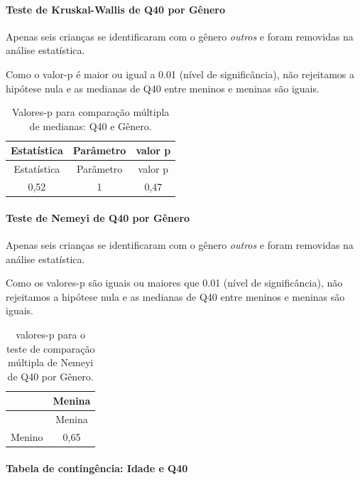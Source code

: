 \documentclass[]{article}
\let\oldparagraph\paragraph
\renewcommand{\paragraph}[1]{\oldparagraph{#1}\mbox{}}
\begin{document}
\hypertarget{teste-de-kruskal-wallis-de-q40-por-guxeanero}{%
\paragraph{Teste de Kruskal-Wallis de Q40 por Gênero}\label{teste-de-kruskal-wallis-de-q40-por-guxeanero}}

Apenas seis crianças se identificaram com o gênero \emph{outros} e foram removidas na análise estatística.

Como o valor-p é maior ou igual a 0.01 (nível de significância), não rejeitamos a hipótese nula e as medianas de Q40 entre meninos e meninas são iguais.

\begin{longtable}[]{@{}ccc@{}}
\caption{\label{tab:unnamed-chunk-1564}Valores-p para comparação múltipla de medianas: Q40 e Gênero.}\tabularnewline
\toprule
Estatística & Parâmetro & valor p\tabularnewline
\midrule
\endfirsthead
\toprule
Estatística & Parâmetro & valor p\tabularnewline
\midrule
\endhead
0,52 & 1 & 0,47\tabularnewline
\bottomrule
\end{longtable}

\hypertarget{teste-de-nemeyi-de-q40-por-guxeanero}{%
\paragraph{Teste de Nemeyi de Q40 por Gênero}\label{teste-de-nemeyi-de-q40-por-guxeanero}}

Apenas seis crianças se identificaram com o gênero \emph{outros} e foram removidas na análise estatística.

Como os valores-p são iguais ou maiores que 0.01 (nível de significância), não rejeitamos a hipótese nula e as medianas de Q40 entre meninos e meninas são iguais.

\begin{longtable}[]{@{}lc@{}}
\caption{\label{tab:unnamed-chunk-1566}valores-p para o teste de comparação múltipla de Nemeyi de Q40 por Gênero.}\tabularnewline
\toprule
& Menina\tabularnewline
\midrule
\endfirsthead
\toprule
& Menina\tabularnewline
\midrule
\endhead
Menino & 0,65\tabularnewline
\bottomrule
\end{longtable}

\cleardoublepage

\hypertarget{tabela-de-continguxeancia-idade-e-q40}{%
\paragraph{Tabela de contingência: Idade e Q40}\label{tabela-de-continguxeancia-idade-e-q40}}
\end{document}
